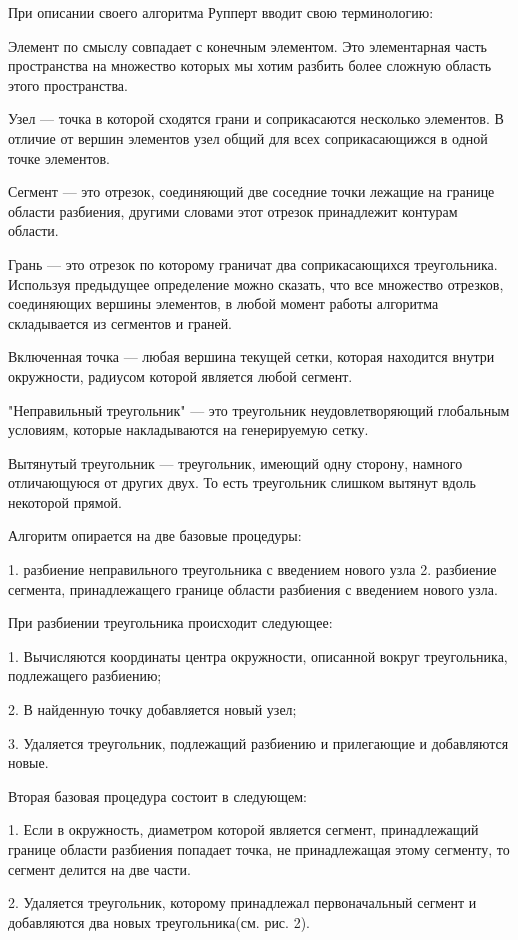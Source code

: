 \documentclass[14pt]{extreport}
\begin{document}
При описании своего алгоритма Рупперт вводит свою терминологию:

Элемент по смыслу совпадает с конечным элементом. Это элементарная часть пространства на множество которых мы хотим разбить более сложную область этого пространства.

Узел — точка в которой сходятся грани и соприкасаются несколько элементов. В отличие от вершин элементов узел общий для всех соприкасающижся в одной точке элементов.

Сегмент — это отрезок, соединяющий две соседние точки лежащие на границе области разбиения, другими словами этот отрезок принадлежит контурам области.

Грань — это отрезок по которому граничат два соприкасающихся треугольника. Используя предыдущее определение можно сказать, что все множество отрезков, соединяющих вершины элементов, в любой момент работы алгоритма складывается из сегментов и граней.

Включенная точка — любая вершина текущей сетки, которая находится внутри окружности, радиусом которой является любой сегмент.

"Неправильный треугольник" — это треугольник неудовлетворяющий глобальным условиям, которые накладываются на генерируемую сетку.

Вытянутый треугольник — треугольник, имеющий одну сторону, намного отличающуюся от других двух. То есть треугольник слишком вытянут вдоль некоторой прямой. 

Алгоритм опирается на две базовые процедуры: 

1. разбиение неправильного треугольника с введением нового узла
2. разбиение сегмента, принадлежащего границе области разбиения с введением нового узла. 

При разбиении треугольника происходит следующее:

1. Вычисляются координаты центра окружности, описанной вокруг треугольника, подлежащего разбиению;

2. В найденную точку добавляется новый узел;

3. Удаляется треугольник, подлежащий разбиению и прилегающие и добавляются новые.

Вторая базовая процедура состоит в следующем:

1. Если в окружность, диаметром которой является сегмент, принадлежащий границе области разбиения попадает точка, не принадлежащая этому сегменту, то сегмент делится на две части.

2. Удаляется треугольник, которому принадлежал первоначальный сегмент и добавляются два новых треугольника(см. рис. 2).
\end{document}
